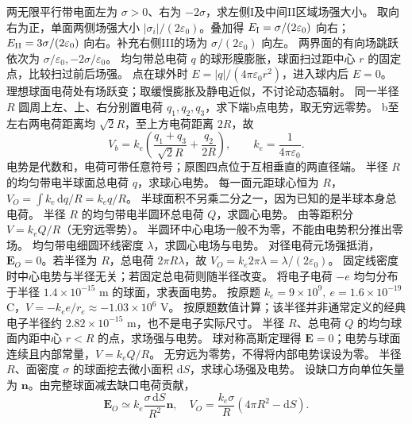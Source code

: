 \problemtext 两无限平行带电面左为 $\sigma>0$、右为 $-2\sigma$，求左侧I及中间II区域场强大小。
\workings 取向右为正，单面两侧场强大小 $|\sigma_i|/(2\varepsilon_0)$。叠加得 $E_{\rm I}=\sigma/(2\varepsilon_0)$ 向右；$E_{\rm II}=3\sigma/(2\varepsilon_0)$ 向右。补充右侧III的场为 $\sigma/(2\varepsilon_0)$ 向左。
\crosscheck 两界面的有向场跳跃依次为 $\sigma/\varepsilon_0,-2\sigma/\varepsilon_0$。
\problemtext 均匀带总电荷 $q$ 的球形膜膨胀，球面扫过距中心 $r$ 的固定点，比较扫过前后场强。
\workings 点在球外时 $E=|q|/(4\pi\varepsilon_0r^2)$，进入球内后 $E=0$。
\crosscheck 理想球面电荷处有场跃变；取缓慢膨胀及静电近似，不讨论动态辐射。
\problemtext 同一半径 $R$ 圆周上左、上、右分别置电荷 $q_1,q_2,q_3$，求下端b点电势，取无穷远零势。
\workings b至左右两电荷距离均 $\sqrt2R$，至上方电荷距离 $2R$，故
\[
V_b=k_e\left(\frac{q_1+q_3}{\sqrt2R}+\frac{q_2}{2R}\right),\qquad k_e=\frac1{4\pi\varepsilon_0}.
\]
\crosscheck 电势是代数和，电荷可带任意符号；原图四点位于互相垂直的两直径端。
\problemtext 半径 $R$ 的均匀带电半球面总电荷 $q$，求球心电势。
\workings 每一面元距球心恒为 $R$，$V_O=\int k_e\,\mathrm dq/R=k_eq/R$。
\crosscheck 半球面积不另乘二分之一，因为已知的是半球本身总电荷。
\problemtext 半径 $R$ 的均匀带电半圆环总电荷 $Q$，求圆心电势。
\workings 由等距积分 $V=k_eQ/R$（无穷远零势）。
\crosscheck 半圆环中心电场一般不为零，不能由电势积分推出零场。
\problemtext 均匀带电细圆环线密度 $\lambda$，求圆心电场与电势。
\workings 对径电荷元场强抵消，$\bm E_O=0$。若半径为 $R$，总电荷 $2\pi R\lambda$，故 $V_O=k_e2\pi\lambda=\lambda/(2\varepsilon_0)$。
\crosscheck 固定线密度时中心电势与半径无关；若固定总电荷则随半径改变。
\problemtext 将电子电荷 $-e$ 均匀分布于半径 $1.4\times10^{-15}$ m 的球面，求表面电势。
\workings 按原题 $k_e=9\times10^9,\ e=1.6\times10^{-19}$ C，$V=-k_ee/r_e\approx-1.03\times10^6$ V。
\crosscheck 按原题数值计算；该半径并非通常定义的经典电子半径约 $2.82\times10^{-15}$ m，也不是电子实际尺寸。
\problemtext 半径 $R$、总电荷 $Q$ 的均匀球面内距中心 $r<R$ 的点，求场强与电势。
\workings 球对称高斯定理得 $\bm E=0$；电势与球面连续且内部常量，$V=k_eQ/R$。
\crosscheck 无穷远为零势，不得将内部电势误设为零。
\problemtext 半径 $R$、面密度 $\sigma$ 的球面挖去微小面积 $\mathrm dS$，求球心场强及电势。
\workings 设缺口方向单位矢量为 $\bm n$。由完整球面减去缺口电荷贡献，
\[
\bm E_O\simeq k_e\frac{\sigma\,\mathrm dS}{R^2}\bm n,\quad
V_O=\frac{k_e\sigma}{R}(4\pi R^2-\mathrm dS).
\]

